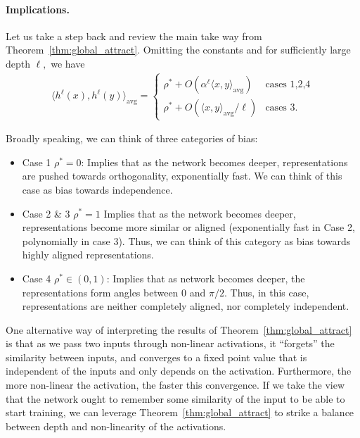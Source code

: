 \documentclass[twoside]{article}
\newcommand{\avg}{\text{avg}}
\theoremstyle{definition}
\begin{document}
\paragraph{Implications.}  Let us take a step back and review the main take way from Theorem~\ref{thm:global_attract}. Omitting the constants and for sufficiently large depth $\ell,$ we have 
\begin{align*}
    \langle h^{\ell}(x), h^{\ell}(y)\rangle_\avg =  \begin{cases}
         \rho^* + O(\alpha ^ \ell \langle x, y \rangle_\avg)  & \text{cases 1,2,4}\\
         \rho^* + O \left(\langle x, y \rangle_\avg/\ell \right)   & \text{cases 3}.
    \end{cases}
\end{align*}

Broadly speaking, we can think of three categories of bias:

\begin{itemize}
    \item Case 1 $\rho^*=0$: Implies that as the network becomes deeper, representations are pushed towards orthogonality, exponentially fast. We can think of this case as bias towards independence. 
    \item Case 2 \& 3 $\rho^*=1$ Implies that as the network becomes deeper, representations become more similar or aligned (exponentially fast in Case 2, polynomially in case 3). Thus, we can think of this category as bias towards highly aligned representations. 
    \item Case 4 $\rho^*\in (0,1)$: Implies that as network becomes deeper, the representations form angles between $0$ and $\pi/2.$ Thus, in this case, representations are neither completely aligned, nor completely independent. 
\end{itemize}

One alternative way of interpreting the results of Theorem~\ref{thm:global_attract} is that as we pass two inputs through non-linear activations, it ``forgets'' the similarity between inputs, and converges to a fixed point value that is independent of the inputs and only depends on the activation. Furthermore, the more non-linear the activation, the faster this convergence. If we take the view that the network ought to remember some similarity of the input to be able to start training, we can leverage Theorem~\ref{thm:global_attract} to strike a balance between depth and non-linearity of the activations. 
\end{document}
